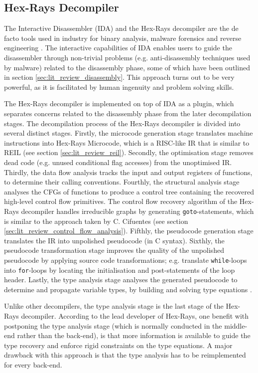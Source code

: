 
\subsection{Hex-Rays Decompiler}
\label{sec:rel_work_hex-rays_decompiler}

The Interactive Disassembler (IDA) and the Hex-Rays decompiler are the de facto tools used in industry for binary analysis, malware forensics and reverse engineering \cite{semantics_preserving_structural_analysis}. The interactive capabilities of IDA enables users to guide the disassembler through non-trivial problems (e.g. anti-disassembly techniques used by malware) related to the disassembly phase, some of which have been outlined in section \ref{sec:lit_review_disassembly}. This approach turns out to be very powerful, as it is facilitated by human ingenuity and problem solving skills.

The Hex-Rays decompiler is implemented on top of IDA as a plugin, which separates concerns related to the disassembly phase from the later decompilation stages. The decompilation process of the Hex-Rays decompiler is divided into several distinct stages. Firstly, the microcode generation stage translates machine instructions into Hex-Rays Microcode, which is a RISC-like IR that is similar to REIL (see section \ref{sec:lit_review_reil}). Secondly, the optimisation stage removes dead code (e.g. unused conditional flag accesses) from the unoptimised IR. Thirdly, the data flow analysis tracks the input and output registers of functions, to determine their calling conventions. Fourthly, the structural analysis stage analyses the CFGs of functions to produce a control tree containing the recovered high-level control flow primitives. The control flow recovery algorithm of the Hex-Rays decompiler handles irreducible graphs by generating \texttt{goto}-statements, which is similar to the approach taken by C. Cifuentes (see section \ref{sec:lit_review_control_flow_analysis}). Fifthly, the pseudocode generation stage translates the IR into unpolished pseudocode (in C syntax).  Sixthly, the pseudocode transformation stage improves the quality of the unpolished pseudocode by applying source code transformations; e.g. translate \texttt{while}-loops into \texttt{for}-loops by locating the initialisation and post-statements of the loop header. Lastly, the type analysis stage analyses the generated pseudocode to determine and propagate variable types, by building and solving type equations \cite{hexrays}.

Unlike other decompilers, the type analysis stage is the last stage of the Hex-Rays decompiler. According to the lead developer of Hex-Rays, one benefit with postponing the type analysis stage (which is normally conducted in the middle-end rather than the back-end), is that more information is available to guide the type recovery and enforce rigid constraints on the type equations. A major drawback with this approach is that the type analysis has to be reimplemented for every back-end.
